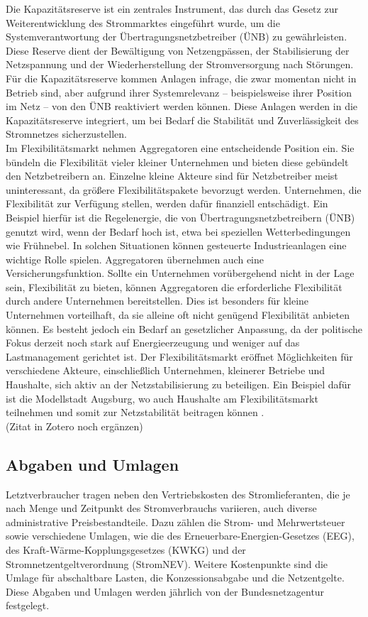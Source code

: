 Die Kapazitätsreserve ist ein zentrales Instrument, das durch das Gesetz zur Weiterentwicklung des Strommarktes eingeführt wurde, um die Systemverantwortung der Übertragungsnetzbetreiber (ÜNB) zu gewährleisten. Diese Reserve dient der Bewältigung von Netzengpässen, der Stabilisierung der Netzspannung und der Wiederherstellung der Stromversorgung nach Störungen. Für die Kapazitätsreserve kommen Anlagen infrage, die zwar momentan nicht in Betrieb sind, aber aufgrund ihrer Systemrelevanz – beispielsweise ihrer Position im Netz – von den ÜNB reaktiviert werden können. Diese Anlagen werden in die Kapazitätsreserve integriert, um bei Bedarf die Stabilität und Zuverlässigkeit des Stromnetzes sicherzustellen.\\

Im Flexibilitätsmarkt nehmen Aggregatoren eine entscheidende Position ein. Sie bündeln die Flexibilität vieler kleiner Unternehmen und bieten diese gebündelt den Netzbetreibern an. Einzelne kleine Akteure sind für Netzbetreiber meist uninteressant, da größere Flexibilitätspakete bevorzugt werden. Unternehmen, die Flexibilität zur Verfügung stellen, werden dafür finanziell entschädigt. Ein Beispiel hierfür ist die Regelenergie, die von Übertragungsnetzbetreibern (ÜNB) genutzt wird, wenn der Bedarf hoch ist, etwa bei speziellen Wetterbedingungen wie Frühnebel. In solchen Situationen können gesteuerte Industrieanlagen eine wichtige Rolle spielen. Aggregatoren übernehmen auch eine Versicherungsfunktion. Sollte ein Unternehmen vorübergehend nicht in der Lage sein, Flexibilität zu bieten, können Aggregatoren die erforderliche Flexibilität durch andere Unternehmen bereitstellen. Dies ist besonders für kleine Unternehmen vorteilhaft, da sie alleine oft nicht genügend Flexibilität anbieten können. Es besteht jedoch ein Bedarf an gesetzlicher Anpassung, da der politische Fokus derzeit noch stark auf Energieerzeugung und weniger auf das Lastmanagement gerichtet ist. Der Flexibilitätsmarkt eröffnet Möglichkeiten für verschiedene Akteure, einschließlich Unternehmen, kleinerer Betriebe und Haushalte, sich aktiv an der Netzstabilisierung zu beteiligen. Ein Beispiel dafür ist die Modellstadt Augsburg, wo auch Haushalte am Flexibilitätsmarkt teilnehmen und somit zur Netzstabilität beitragen können \cite{Projektziel}.\\ (Zitat in Zotero noch ergänzen)

\subsection{Abgaben und Umlagen}
Letztverbraucher tragen neben den Vertriebskosten des Stromlieferanten, die je nach Menge und Zeitpunkt des Stromverbrauchs variieren, auch diverse administrative Preisbestandteile. Dazu zählen die Strom- und Mehrwertsteuer sowie verschiedene Umlagen, wie die des Erneuerbare-Energien-Gesetzes (EEG), des Kraft-Wärme-Kopplungsgesetzes (KWKG) und der Stromnetzentgeltverordnung (StromNEV). Weitere Kostenpunkte sind die Umlage für abschaltbare Lasten, die Konzessionsabgabe und die Netzentgelte. Diese Abgaben und Umlagen werden jährlich von der Bundesnetzagentur festgelegt.\\


